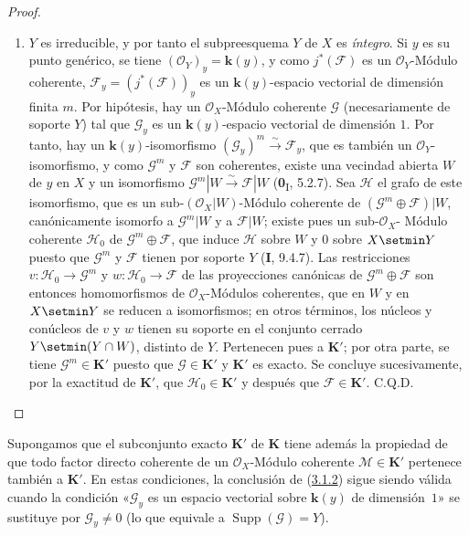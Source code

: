 \begin{proof}
\begin{enumerate}
\item[\textit{b)}] $Y$ es irreducible, y por tanto el subpreesquema $Y$ de $X$ es
\emph{íntegro}. Si $y$ es su punto genérico, se tiene
$(\mathcal O_Y)_y=\boldsymbol{k}(y)$, y como $j^*(\mathcal F)$ es un
$\mathcal O_Y$-Módulo coherente, $\mathcal F_y=(j^*(\mathcal F))_y$ es un
$\boldsymbol{k}(y)$-espacio vectorial de dimensión finita $m$. Por hipótesis, hay un
$\mathcal O_X$-Módulo coherente $\mathcal G$ (necesariamente de soporte $Y$)
tal que $\mathcal G_y$ es un $\boldsymbol{k}(y)$-espacio vectorial de dimensión $1$. Por
tanto, hay un $\boldsymbol{k}(y)$-isomorfismo
$(\mathcal G_y)^m\xrightarrow{\sim}\mathcal F_y$, que es también un
$\mathcal O_Y$-isomorfismo, y como $\mathcal G^m$ y $\mathcal F$ son
coherentes, existe una vecindad abierta $W$ de $y$ en $X$ y un
isomorfismo $\mathcal G^m|W\xrightarrow{\sim}\mathcal F|W$
(\textbf{0}\textsubscript{I}, 5.2.7). Sea $\mathcal H$ el grafo de este isomorfismo,
que es un sub-$(\mathcal O_X|W)$-Módulo coherente de
$(\mathcal G^m\oplus\mathcal F)|W$, canónicamente isomorfo a
$\mathcal G^m|W$ y a $\mathcal F|W$; existe pues un sub-$\mathcal O_X$-%
Módulo coherente $\mathcal H_0$ de $\mathcal G^m\oplus\mathcal F$, que induce
$\mathcal H$ sobre $W$ y $0$ sobre $X\setmin Y$ puesto que $\mathcal G^m$ y
$\mathcal F$ tienen por soporte $Y$ (\textbf{I}, 9.4.7). Las restricciones
$v:\mathcal H_0\to\mathcal G^m$ y $w:\mathcal H_0\to\mathcal F$ de las
proyecciones canónicas de $\mathcal G^m\oplus\mathcal F$ son entonces
homomorfismos de $\mathcal O_X$-Módulos coherentes, que en $W$ y en
$X\setmin Y$ se reducen a isomorfismos; en otros términos, los núcleos y
conúcleos de $v$ y $w$ tienen su soporte en el conjunto cerrado
$Y\setmin(Y\cap W)$, distinto de $Y$. Pertenecen pues a $\boldsymbol{K}'$; por otra
parte, se tiene $\mathcal G^m\in\boldsymbol{K}'$ puesto que $\mathcal G\in\boldsymbol{K}'$ y $\boldsymbol{K}'$ es
exacto. Se concluye sucesivamente, por la exactitud de $\boldsymbol{K}'$, que
$\mathcal H_0\in\boldsymbol{K}'$ y después que $\mathcal F\in\boldsymbol{K}'$. C.Q.D.
\end{enumerate}
\end{proof}

\begin{corollary}[3.1.3]
\label{III.3.1.3-fr}
Supongamos que el subconjunto exacto $\boldsymbol{K}'$ de $\boldsymbol{K}$ tiene además la propiedad
de que todo factor directo coherente de un $\mathcal O_X$-Módulo coherente
$\mathcal M\in\boldsymbol{K}'$ pertenece también a $\boldsymbol{K}'$. En estas condiciones, la
conclusión de (\hyperref[III.3.1.2-fr]{3.1.2}) sigue siendo válida cuando la
condición «$\mathcal G_y$ es un espacio vectorial sobre $\boldsymbol{k}(y)$ de dimensión~$1$» se sustituye por $\mathcal G_y\neq0$ (lo que equivale a $\operatorname{Supp}(\mathcal G)=Y$).
\end{corollary}

